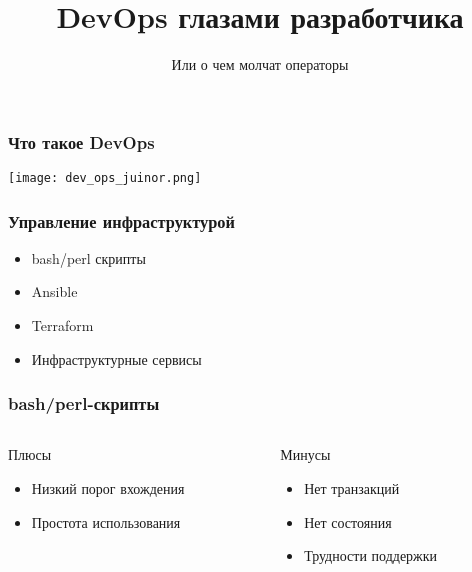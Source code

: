 \documentclass[mathserif,serif]{beamer}
\title[DevOps глазами разработчика]
{DevOps глазами разработчика}
\subtitle{Или о чем молчат операторы}
\date
{}
\begin{document}
\frame{\titlepage}

\begin{frame}
	\frametitle{Что такое DevOps}
	\texttt{[image: dev\_ops\_juinor.png]}
\end{frame}

\begin{frame}
	\frametitle{Управление инфраструктурой}
	\begin{itemize}
		\item{bash/perl скрипты}
		\item{Ansible}
		\item{Terraform}
		\item{Инфраструктурные сервисы}
	\end{itemize}
\end{frame}

\begin{frame}
	\frametitle{bash/perl-скрипты}
	\begin{columns}[T]
		\begin{column}{.5\linewidth}
			\begin{minipage}[c][\textheight][c]{\linewidth}
          			Плюсы
				\begin{itemize}
					\item{Низкий порог вхождения}
					\item{Простота использования}
				\end{itemize}
			\end{minipage}
		\end{column}
		\begin{column}{.5\linewidth}
			\begin{minipage}[c][\textheight][c]{\linewidth}
          			Минусы
				\begin{itemize}
					\item{Нет транзакций}
					\item{Нет состояния}
					\item{Трудности поддержки}
				\end{itemize}
			\end{minipage}
		\end{column}
	\end{columns}
\end{frame}
\end{document}
